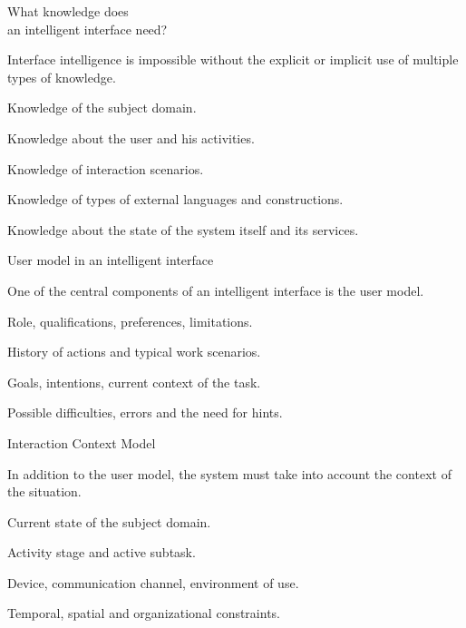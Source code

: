\begin{frame}{What knowledge does\\ an intelligent interface need?}
	\topline
	\justifying
	
	Interface intelligence is impossible without the explicit or implicit use of multiple types of knowledge.
	
	\begin{textitemize}
		\item Knowledge of the subject domain.
		\item Knowledge about the user and his activities.
		\item Knowledge of interaction scenarios.
		\item Knowledge of types of external languages and constructions.
		\item Knowledge about the state of the system itself and its services.
	\end{textitemize}
\end{frame}

\begin{frame}{User model in an intelligent interface}
	\topline
	\justifying
	
	One of the central components of an intelligent interface is the user model.
	
	\begin{textitemize}
		\item Role, qualifications, preferences, limitations.
		\item History of actions and typical work scenarios.
		\item Goals, intentions, current context of the task.
		\item Possible difficulties, errors and the need for hints.
	\end{textitemize}
\end{frame}

\begin{frame}{Interaction Context Model}
	\topline
	\justifying
	
	In addition to the user model, the system must take into account the context of the situation.
	
	\begin{textitemize}
		\item Current state of the subject domain.
		\item Activity stage and active subtask.
		\item Device, communication channel, environment of use.
		\item Temporal, spatial and organizational constraints.
	\end{textitemize}
\end{frame}

